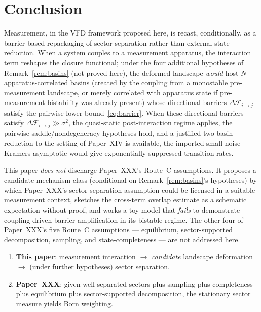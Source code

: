 \documentclass[12pt]{article}
\newcommand{\Fcal}{\mathcal{F}}
\begin{document}
\section{Conclusion}\label{sec:conclusion}

Measurement, in the VFD framework proposed here, is recast, conditionally, as a barrier-based repackaging of sector separation rather than external state reduction. When a system couples to a measurement apparatus, the interaction term reshapes the closure functional; under the four additional hypotheses of Remark~\ref{rem:basins} (not proved here), the deformed landscape \emph{would} host $N$ apparatus-correlated basins (created by the coupling from a monostable pre-measurement landscape, or merely correlated with apparatus state if pre-measurement bistability was already present) whose directional barriers $\Delta\Fcal_{i\to j}$ satisfy the pairwise lower bound~\eqref{eq:barrier}. When these directional barriers satisfy $\Delta\Fcal_{i\to j} \gg \sigma^2$, the quasi-static post-interaction regime applies, the pairwise saddle/nondegeneracy hypotheses hold, and a justified two-basin reduction to the setting of Paper~XIV is available, the imported small-noise Kramers asymptotic would give exponentially suppressed transition rates.

This paper \emph{does not} discharge Paper~XXX's Route~C assumptions. It proposes a candidate mechanism class (conditional on Remark~\ref{rem:basins}'s hypotheses) by which Paper~XXX's sector-separation assumption could be licensed in a suitable measurement context, sketches the cross-term overlap estimate as a schematic expectation without proof, and works a toy model that \emph{fails} to demonstrate coupling-driven barrier amplification in its bistable regime. The other four of Paper~XXX's five Route~C assumptions --- equilibrium, sector-supported decomposition, sampling, and state-completeness --- are not addressed here.

\begin{enumerate}
    \item \textbf{This paper}: measurement interaction $\to$ \emph{candidate} landscape deformation $\to$ (under further hypotheses) sector separation.
    \item \textbf{Paper~XXX}: given well-separated sectors plus sampling plus completeness plus equilibrium plus sector-supported decomposition, the stationary sector measure yields Born weighting.
\end{enumerate}
\end{document}
